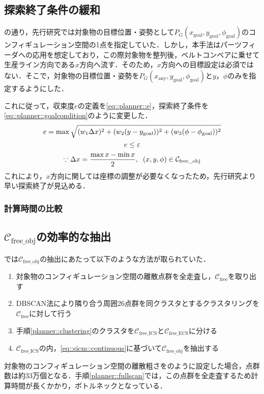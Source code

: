 \documentclass[a4paper,twoside,12pt,papersize, dvipdfmx]{iirthesis}
\begin{document}
\subsection{探索終了条件の緩和}\label{subsec::planner::goalcond}
の通り，先行研究では対象物の目標位置・姿勢として$P_G (x_{\mathrm {goal}}, y_{\mathrm {goal}}, \phi_{\mathrm {goal}})$のコンフィギュレーション空間の1点を指定していた．しかし，本手法はパーツフィーダへの応用を想定しており，この際対象物を整列後，ベルトコンベアに乗せて生産ライン方向である$x$方向へ流す．そのため，$x$方向への目標設定は必須ではない．そこで，対象物の目標位置・姿勢を$P_G (x_{\mathrm {any}}, y_{\mathrm {goal}}, \phi_{\mathrm {goal}})$と$y$，$\phi$のみを指定するようにした．\par
これに従って，収束度$e$の定義を\eqref{eq::planner::e}，探索終了条件を\eqref{eq::planner::goalcondition}のように変更した．
\begin{gather}
e = \max \sqrt{(w_1\Delta x)^2 + (w_2(y-y_{\mathrm{goal}}))^2 + (w_3(\phi-\phi_{\mathrm{goal}}))^2} \label{eq::planner::e} \\
e \leq \varepsilon \label{eq::planner::goalcondition} \\
\because  \Delta x = \dfrac{\max x  - \min x}{2} ,\;\; (x, y, \phi) \in \mathcal{C}_{\mathrm{free\_obj}} \notag
\end{gather}
これにより，$x$方向に関しては座標の調整が必要なくなったため，先行研究より早い探索終了が見込める．

\subsubsection{計算時間の比較}


\subsection{$\mathcal{C}_{\mathrm{free\_obj}}$の効率的な抽出}\label{subsec::planner::dfs}
\cite{komiyama2021}では$\mathcal{C}_{\mathrm{free\_obj}}$の抽出にあたって以下のような方法が取られていた．
\begin{enumerate}
\item 対象物のコンフィギュレーション空間の離散点群を全走査し，$\mathcal{C}_{\mathrm{free}}$を取り出す \label{planner::fullscan}
\item DBSCAN法\cite{}により隣り合う周囲26点群を同クラスタとするクラスタリングを$\mathcal{C}_{\mathrm{free}}$に対して行う\label{planner::clustering}
\item 手順\ref{planner::clustering}のクラスタを$\mathcal{C}_{\mathrm{free\_ICS}}$と$\mathcal{C}_{\mathrm{free\_ECS}}$に分ける
\item $\mathcal{C}_{\mathrm{free\_ICS}}$の内，\eqref{eq::sicm::continuous}に基づいて$\mathcal{C}_{\mathrm{free\_obj}}$を抽出する
\end{enumerate}
対象物のコンフィギュレーション空間の離散粗さをのように設定した場合，点群数は約33万個となる．手順\ref{planner::fullscan}では，この点群を全走査するため計算時間が長くかかり，ボトルネックとなっている．\par
\end{document}
